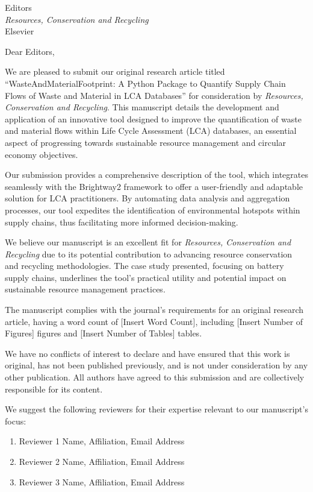 \documentclass[10pt]{letter}
\begin{document}
\thispagestyle{empty}
\begin{letter}{Editors\\\textit{Resources, Conservation and Recycling}\\Elsevier}

\opening{Dear Editors,}

We are pleased to submit our original research article titled ``WasteAndMaterialFootprint: A Python Package to Quantify Supply Chain Flows of Waste and Material in LCA Databases'' for consideration by \textit{Resources, Conservation and Recycling}. This manuscript details the development and application of an innovative tool designed to improve the quantification of waste and material flows within Life Cycle Assessment (LCA) databases, an essential aspect of progressing towards sustainable resource management and circular economy objectives.

Our submission provides a comprehensive description of the tool, which integrates seamlessly with the Brightway2 framework to offer a user-friendly and adaptable solution for LCA practitioners. By automating data analysis and aggregation processes, our tool expedites the identification of environmental hotspots within supply chains, thus facilitating more informed decision-making.

We believe our manuscript is an excellent fit for \textit{Resources, Conservation and Recycling} due to its potential contribution to advancing resource conservation and recycling methodologies. The case study presented, focusing on battery supply chains, underlines the tool's practical utility and potential impact on sustainable resource management practices.

The manuscript complies with the journal's requirements for an original research article, having a word count of [Insert Word Count], including [Insert Number of Figures] figures and [Insert Number of Tables] tables.

We have no conflicts of interest to declare and have ensured that this work is original, has not been published previously, and is not under consideration by any other publication. All authors have agreed to this submission and are collectively responsible for its content. 

\vspace{1em}

We suggest the following reviewers for their expertise relevant to our manuscript's focus:

\begin{enumerate}
    \item {Reviewer 1 Name, Affiliation, Email Address}
    \item {Reviewer 2 Name, Affiliation, Email Address}
    \item {Reviewer 3 Name, Affiliation, Email Address}
\end{enumerate}
\vspace{1em}


\end{letter}
\end{document}
